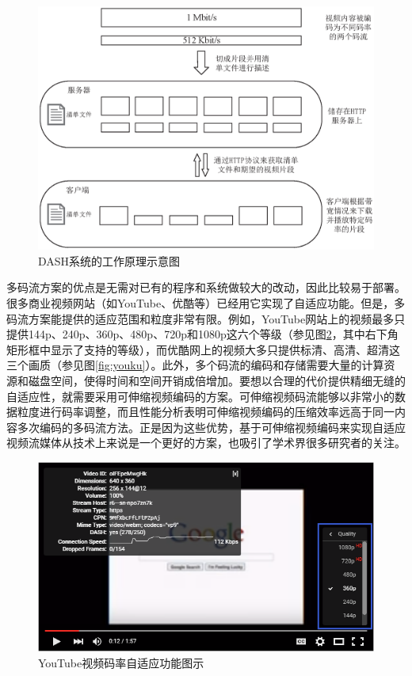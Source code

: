 \begin{figure}[t]
	\centering
	\includegraphics[width = 1.0\linewidth]{eps/DASH}
	\caption{DASH系统的工作原理示意图\label{fig:DASH}}
\end{figure}

多码流方案的优点是无需对已有的程序和系统做较大的改动，因此比较易于部署\supercite{Bouten2014}。很多商业视频网站（如YouTube、优酷等）已经用它实现了自适应功能。但是，多码流方案能提供的适应范围和粒度非常有限。例如，YouTube网站上的视频最多只提供144p、240p、360p、480p、720p和1080p这六个等级（参见图\ref{fig:youtube}，其中右下角矩形框中显示了支持的等级），而优酷网上的视频大多只提供标清、高清、超清这三个画质（参见图\ref{fig:youku}）。此外，多个码流的编码和存储需要大量的计算资源和磁盘空间，使得时间和空间开销成倍增加。要想以合理的代价提供精细无缝的自适应性，就需要采用可伸缩视频编码的方案。可伸缩视频码流能够以非常小的数据粒度进行码率调整，而且性能分析表明可伸缩视频编码的压缩效率远高于同一内容多次编码的多码流方法\supercite{SVC-Performance}。正是因为这些优势，基于可伸缩视频编码来实现自适应视频流媒体从技术上来说是一个更好的方案，也吸引了学术界很多研究者的关注\supercite{Chuah2012, Zhu2013, Dan2013, Yang2014, Cicalo2014}。

\begin{figure}[t]
	\centering
	\includegraphics[width = 1.0\linewidth]{figures/youtube.png}
	\caption{YouTube视频码率自适应功能图示\label{fig:youtube}}
\end{figure}

